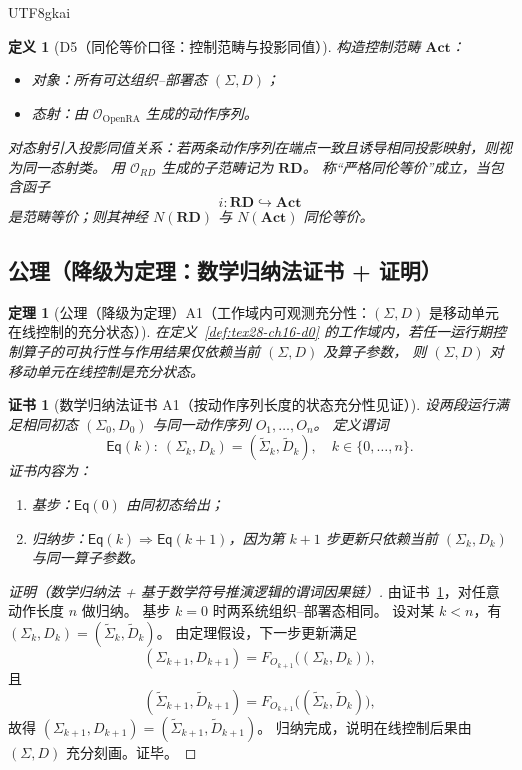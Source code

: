 \documentclass[12pt]{article}
\newtheorem{definition}{定义}[section]
\newtheorem{theorem}{定理}[section]
\newtheorem{Certificate}{证书}[section]
\begin{document}
\begin{CJK*}{UTF8}{gkai}
\begin{definition}[D5（同伦等价口径：控制范畴与投影同值）]
\label{def:tex28-ch16-d5}
构造控制范畴 $\mathbf{Act}$：
\begin{itemize}
  \item 对象：所有可达组织--部署态 $(\Sigma,D)$；
  \item 态射：由 $\mathcal O_{\mathrm{OpenRA}}$ 生成的动作序列。
\end{itemize}
对态射引入投影同值关系：若两条动作序列在端点一致且诱导相同投影映射，则视为同一态射类。
用 $\mathcal O_{RD}$ 生成的子范畴记为 $\mathbf{RD}$。
称“严格同伦等价”成立，当包含函子
\[
  i:\mathbf{RD}\hookrightarrow\mathbf{Act}
\]
是范畴等价；则其神经 $N(\mathbf{RD})$ 与 $N(\mathbf{Act})$ 同伦等价。
\end{definition}

\subsection{公理（降级为定理：数学归纳法证书 + 证明）}
\label{subsec:tex28-ch16-axioms}

\begin{theorem}[公理（降级为定理）A1（工作域内可观测充分性：$(\Sigma,D)$ 是移动单元在线控制的充分状态）]
\label{thm:tex28-ch16-a1}
在定义~\ref{def:tex28-ch16-d0} 的工作域内，若任一运行期控制算子的可执行性与作用结果仅依赖当前 $(\Sigma,D)$ 及算子参数，
则 $(\Sigma,D)$ 对移动单元在线控制是充分状态。
\end{theorem}

\begin{Certificate}[数学归纳法证书 A1（按动作序列长度的状态充分性见证）]
\label{cert:tex28-ch16-a1}
设两段运行满足相同初态 $(\Sigma_0,D_0)$ 与同一动作序列 $O_1,\dots,O_n$。
定义谓词
\[
  \mathsf{Eq}(k):\ (\Sigma_k,D_k)=(\widetilde\Sigma_k,\widetilde D_k),\quad k\in\{0,\dots,n\}.
\]
证书内容为：
\begin{enumerate}
  \item 基步：$\mathsf{Eq}(0)$ 由同初态给出；
  \item 归纳步：$\mathsf{Eq}(k)\Rightarrow \mathsf{Eq}(k+1)$，因为第 $k+1$ 步更新只依赖当前 $(\Sigma_k,D_k)$ 与同一算子参数。
\end{enumerate}
\end{Certificate}

\begin{proof}[证明（数学归纳法 + 基于数学符号推演逻辑的谓词因果链）]
由证书~\ref{cert:tex28-ch16-a1}，对任意动作长度 $n$ 做归纳。
基步 $k=0$ 时两系统组织--部署态相同。
设对某 $k<n$，有 $(\Sigma_k,D_k)=(\widetilde\Sigma_k,\widetilde D_k)$。
由定理假设，下一步更新满足
\[
  (\Sigma_{k+1},D_{k+1})
  =
  F_{O_{k+1}}\!\bigl((\Sigma_k,D_k)\bigr),
\]
且
\[
  (\widetilde\Sigma_{k+1},\widetilde D_{k+1})
  =
  F_{O_{k+1}}\!\bigl((\widetilde\Sigma_k,\widetilde D_k)\bigr),
\]
故得 $(\Sigma_{k+1},D_{k+1})=(\widetilde\Sigma_{k+1},\widetilde D_{k+1})$。
归纳完成，说明在线控制后果由 $(\Sigma,D)$ 充分刻画。证毕。
\end{proof}


\end{CJK*}
\end{document}

